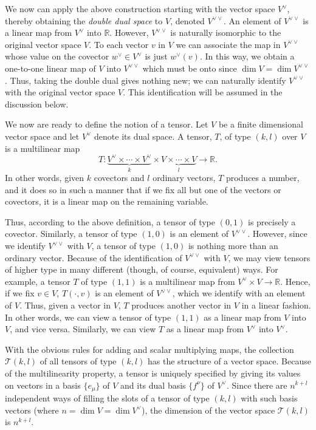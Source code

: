 We now can apply the above construction starting with the vector space \(V^\vee\),
thereby obtaining the \emph{double dual space} to \(V\), denoted \(V^{\vee\vee}\).  An
element of \(V^{\vee\vee}\) is a linear map from \(V^\vee\) into \(\mathbb{R}\).  However,
\(V^{\vee\vee}\) is naturally isomorphic to the original vector space \(V\).  To each
vector \(v\) in \(V\) we can associate the map in \(V^{\vee\vee}\) whose value on the
covector \(w^\vee\in V^\vee\) is just \(w^\vee(v)\).  In this way, we obtain a one-to-one
linear map of \(V\) into \(V^{\vee\vee}\) which must be onto since
\(\dim V=\dim V^{\vee\vee}\).  Thus, taking the double dual gives nothing new; we can
naturally identify \(V^{\vee\vee}\) with the original vector space \(V\).  This
identification will be assumed in the discussion below.

We now are ready to define the notion of a tensor.  Let \(V\) be a finite
dimensional vector space and let \(V^\vee\) denote its dual space.  A tensor, \(T\),
of type \((k,l)\) over \(V\) is a multilinear map
\[
  T:\underbrace{V^\vee\times\cdots\times V^\vee}_{k}
  \times\underbrace{V\times\cdots\times V}_{l}\longrightarrow\mathbb{R} .
\]
In other words, given \(k\) covectors and \(l\) ordinary vectors, \(T\) produces a
number, and it does so in such a manner that if we fix all but one of the vectors or
covectors, it is a linear map on the remaining variable.

Thus, according to the above definition, a tensor of type \((0,1)\) is precisely a
covector.  Similarly, a tensor of type \((1,0)\) is an element of \(V^{\vee\vee}\).
However, since we identify \(V^{\vee\vee}\) with \(V\), a tensor of type \((1,0)\) is
nothing more than an ordinary vector.  Because of the identification of \(V^{\vee\vee}\)
with \(V\), we may view tensors of higher type in many different (though, of
course, equivalent) ways.  For example, a tensor \(T\) of type \((1,1)\) is a
multilinear map from \(V^\vee\times V\to\mathbb{R}\).  Hence, if we fix \(v\in V\),
\(T(\mathord\cdot,v)\) is an element of \(V^{\vee\vee}\), which we identify with an
element of \(V\).  Thus, given a vector in \(V\), \(T\) produces another vector in
\(V\) in a linear fashion.  In other words, we can view a tensor of type \((1,1)\)
as a linear map from \(V\) into \(V\), and vice versa.  Similarly, we can view
\(T\) as a linear map from \(V^\vee\) into \(V^\vee\).

With the obvious rules for adding and scalar multiplying maps, the collection
\(\mathcal T(k,l)\) of all tensors of type \((k,l)\) has the structure of a vector
space.  Because of the multilinearity property, a tensor is uniquely specified by
giving its values on vectors in a basis \(\{e_\mu\}\) of \(V\) and its dual basis
\(\{f^{\nu}\}\) of \(V^\vee\).  Since there are \(n^{k+l}\) independent ways of
filling the slots of a tensor of type \((k,l)\) with such basis vectors (where
\(n=\dim V=\dim V^\vee\)), the dimension of the vector space \(\mathcal T(k,l)\)
is \(n^{k+l}\).

